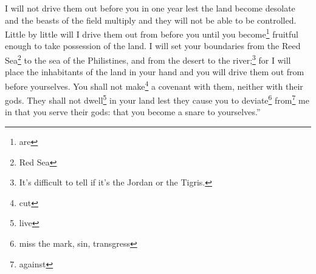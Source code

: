 \begin{enumerate}
     I will not drive them out before you in one year lest the land become desolate and the beasts of the field multiply and they will not be able to be controlled.%
     Little by little will I drive them out from before you until you become\footnote{are} fruitful enough to take possession of the land.%
     I will set your boundaries from the Reed Sea\footnote{Red Sea} to the sea of the Philistines, and from the desert to the river;\footnote{It's difficult to tell if it's the Jordan or the Tigris.} for I will place the inhabitants of the land in your hand and you will drive them out from before yourselves.%
     You shall not make\footnote{cut} a covenant with them, neither with their gods.%
     They shall not dwell\footnote{live} in your land lest they cause you to deviate\footnote{miss the mark, sin, transgress} from\footnote{against} me in that you serve their gods: that you become a snare to yourselves.''%
\end{enumerate}
